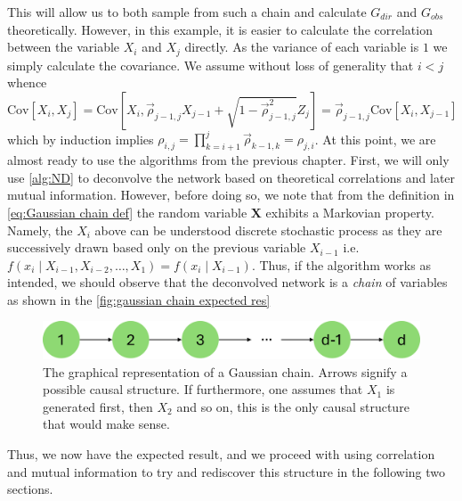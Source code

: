 \documentclass[../Thesis.tex]{subfiles}
\begin{document}
This will allow us to both sample from such a chain and calculate $G_{dir}$ and $G_{obs}$ theoretically. However, in this example, it is easier to calculate the correlation between the variable $X_i$ and $X_j$ directly. As the variance of each variable is $1$ we simply calculate the covariance. We assume without loss of generality that $i < j$ whence
$$\text{Cov}\left[X_i, X_j\right] = \text{Cov}\left[X_i, \vec{\rho}_{j-1,j} X_{j-1} + \sqrt{1 - \vec{\rho}_{j-1,j}^2}Z_j\right] = \vec{\rho}_{j-1,j} \text{Cov}\left[X_i, X_{j-1}\right]$$
which by induction implies $\rho_{i,j} = \prod_{k=i+1}^{j} \vec{\rho}_{k-1,k} = \rho_{j,i}$. At this point, we are almost ready to use the algorithms from the previous chapter. First, we will only use \autoref{alg:ND} to deconvolve the network based on theoretical correlations and later mutual information. However, before doing so, we note that from the definition in \autoref{eq:Gaussian chain def} the random variable $\boldsymbol X$ exhibits a Markovian property. Namely, the $X_i$ above can be understood discrete stochastic process as they are successively drawn based only on the previous variable $X_{i-1}$ i.e. $f\left(x_i \mid X_{i-1}, X_{i-2}, \dots, X_{1}\right) = f\left(x_i \mid X_{i-1}\right)$. Thus, if the algorithm works as intended, we should observe that the deconvolved network is a \textit{chain} of variables as shown in the \autoref{fig:gaussian chain expected res}
\begin{figure}[ht]
    \centering
    \includegraphics[width = .7\linewidth]{figures/ND examples/Gaussian chain.png}
    \caption{The graphical representation of a Gaussian chain. Arrows signify a possible causal structure. If furthermore, one assumes that $X_1$ is generated first, then $X_2$ and so on, this is the only causal structure that would make sense.}
    \label{fig:gaussian chain expected res}
\end{figure}
Thus, we now have the expected result, and we proceed with using correlation and mutual information to try and rediscover this structure in the following two sections.

\newpage
\end{document}
